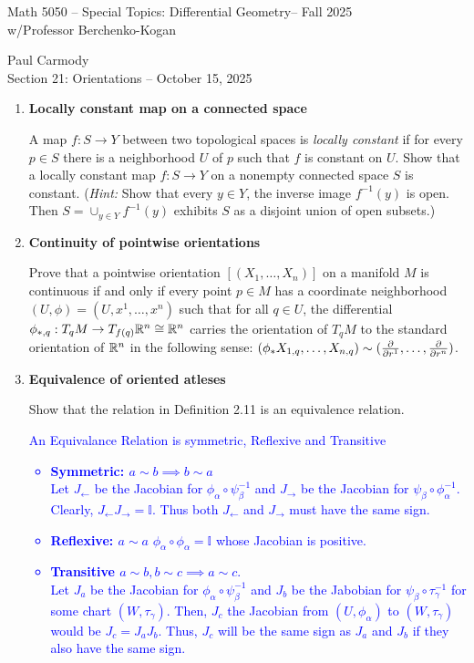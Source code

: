 \documentclass[12pt,a4paper]{report}
\newcommand{\CLASSNAME}{Math 5050 -- Special Topics: Differential Geometry}
\newcommand{\STUDENTNAME}{Paul Carmody}
\newcommand{\ASSIGNMENT}{Section 21: Orientations }
\newcommand{\DUEDATE}{October 15, 2025}
\newcommand{\PROFESSOR}{Professor Berchenko-Kogan}
\newcommand{\SEMESTER}{Fall 2025}
\newcommand{\BLUE}[1]{\textcolor{blue}{#1}}
\begin{document}
\begin{center}
	\Large{\CLASSNAME -- \SEMESTER} \\
	\large{ w/\PROFESSOR}
\end{center}
\begin{center}
	\STUDENTNAME \\
	\ASSIGNMENT -- \DUEDATE\\
\end{center} 


\begin{enumerate}[label=21.\arabic*]

\item \textbf{Locally constant map on a connected space}

A map $f: S \to Y$ between two topological spaces is \textit{locally constant} if for every $p\in S$ there is a neighborhood $U$ of $p$  such that $f$ is constant on $U$.  Show that a locally constant map $f:S\to Y$ on a nonempty connected space $S$ is constant.  (\textit{Hint: }Show that every $y \in Y$, the inverse image $f^{-1}(y)$ is open.  Then $S =\cup_{y\in Y}f^{-1}(y)$ exhibits $S$ as a disjoint union of open subsets.)

\item \textbf{Continuity of pointwise orientations}

Prove that a pointwise orientation $[(X_1,\dots, X_n)]$ on a manifold $M$ is continuous if and only if every point $p \in M$  has a coordinate neighborhood $(U,\phi)=(U, x^1,\dots, x^n)$ such that for all $q \in U$, the differential $\phi_{*,q}:T_qM\to T_{f(q)}\mathbb{R}^n\cong\mathbb{R}^n$ carries the orientation of $T_qM$ to the standard orientation of $\mathbb{R}^n$ in the following sense: $(\phi_*X_{1,q},\dots,X_{n,q})\sim(\frac{\partial }{\partial r^1},\dots,\frac{\partial }{\partial r^n})$.

\item \textbf{Equivalence of oriented atleses}

Show that the relation in Definition 2.11 is an equivalence relation.

\BLUE{An Equivalance Relation is symmetric, Reflexive and Transitive
\begin{itemize}
	\item \textbf{Symmetric: $a\sim b \implies b \sim a$}\\
	Let $J_\leftarrow$ be the Jacobian for $\phi_\alpha \circ \psi^{-1}_\beta$ and $J_\rightarrow$ be the Jacobian for $\psi_\beta \circ \phi_\alpha^{-1}$.  Clearly, $J_\leftarrow J_\rightarrow = \mathbb{I}$.  Thus both $J_\leftarrow$ and $J_\rightarrow$ must have the same sign.
	\item \textbf{Reflexive: $a\sim a$}
	$\phi_\alpha \circ \phi_\alpha = \mathbb{I}$ whose Jacobian is positive.		
	\item \textbf{Transitive $a \sim b, b\sim c \implies a \sim c$}.\\
	Let $J_a$ be the Jacobian for $\phi_\alpha \circ \psi^{-1}_\beta$ and $J_b$ be the Jabobian for $\psi_\beta \circ \tau^{-1}_\gamma$ for some chart $(W, \tau_\gamma)$.  Then, $J_c$ the Jacobian from $(U, \phi_\alpha)$ to $(W, \tau_\gamma)$ would be $J_c = J_a J_b$.  Thus, $J_c$ will be the same sign as $J_a$ and $J_b$ if they also have the same sign.
\end{itemize}
}


\end{enumerate}
\end{document}
